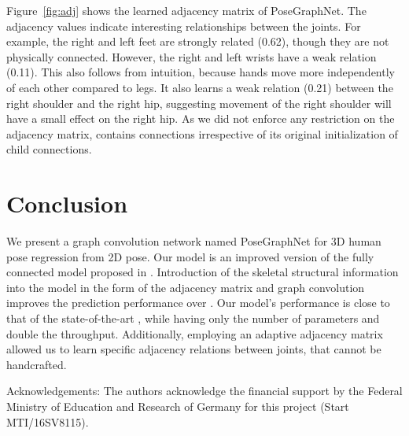 \documentclass{article}
\begin{document}
Figure~\ref{fig:adj} shows the learned adjacency matrix  of PoseGraphNet.
The adjacency values indicate interesting relationships between the joints.
For example, the right and left feet are strongly related (0.62), though they are not physically connected.
However, the right and left wrists have a weak relation (0.11).
This also follows from intuition, because hands move more independently of each other compared to legs.
It also learns a weak relation (0.21) between the right shoulder and the right hip, suggesting movement of the right shoulder will have a small effect on the right hip.
As we did not enforce any restriction on the adjacency matrix,  contains connections irrespective of its original initialization of child connections.


\section{Conclusion}
We present a graph convolution network named PoseGraphNet for 3D human pose regression from 2D pose.
Our model is an improved version of the fully connected model proposed in \cite{Martinez2017}. Introduction of the skeletal structural information into the model in the form of the adjacency matrix and graph convolution improves the prediction performance over \cite{Martinez2017}. Our model's performance is close to that of the state-of-the-art \cite{Cai2019}, while having only  the number of parameters and double the throughput. Additionally, employing an adaptive adjacency matrix allowed us to learn specific adjacency relations between joints, that cannot be handcrafted.

Acknowledgements: The authors acknowledge the financial support by the Federal Ministry of Education and Research of Germany for this project (Start MTI/16SV8115).




\end{document}
